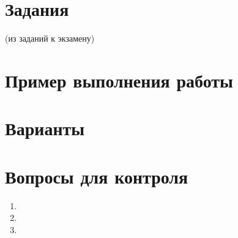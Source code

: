 \section{Задания}\label{sect8_b}
%
(из заданий к экзамену)
\section{Пример выполнения работы}\label{sect8_c}
%
\section{Варианты}\label{sect8_d}
%
\section{Вопросы для контроля}\label{sect8_e}
%
\begin{enumerate}
  \item
  \item
  \item
\end{enumerate}
